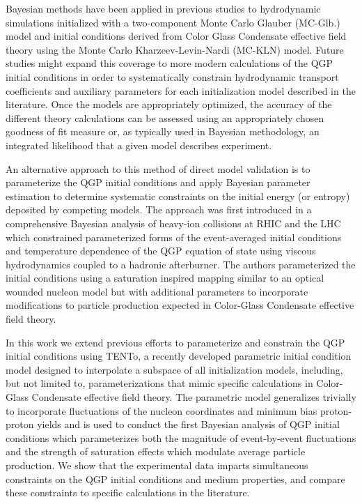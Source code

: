 \documentclass[aps,prc,reprint,amsmath,nofootinbib]{revtex4-1}
\newcommand{\trento}{T\raisebox{-0.5ex}{R}ENTo}
\begin{document}
Bayesian methods have been applied in previous studies to hydrodynamic simulations initialized with a two-component Monte Carlo Glauber (MC-Glb.) model and initial conditions derived from Color Glass Condensate effective field theory using the Monte Carlo Kharzeev-Levin-Nardi (MC-KLN) model.
Future studies might expand this coverage to more modern calculations of the QGP initial conditions in order to systematically constrain hydrodynamic transport coefficients and auxiliary parameters for each initialization model described in the literature.
Once the models are appropriately optimized, the accuracy of the different theory calculations can be assessed using an appropriately chosen goodness of fit measure or, as typically used in Bayesian methodology, an integrated likelihood that a given model describes experiment. 

An alternative approach to this method of direct model validation is to parameterize the QGP initial conditions and apply Bayesian parameter estimation to determine systematic constraints on the initial energy (or entropy) deposited by competing models.
The approach was first introduced in a comprehensive Bayesian analysis of heavy-ion collisions at RHIC and the LHC which constrained parameterized forms of the event-averaged initial conditions and temperature dependence of the QGP equation of state using viscous hydrodynamics coupled to a hadronic afterburner.
The authors parameterized the initial conditions using a saturation inspired mapping similar to an optical wounded nucleon model but with additional parameters to incorporate modifications to particle production expected in Color-Glass Condensate effective field theory.

In this work we extend previous efforts to parameterize and constrain the QGP initial conditions using \trento , a recently developed parametric initial condition model designed to interpolate a subspace of all initialization models, including, but not limited to, parameterizations that mimic specific calculations in Color-Glass Condensate effective field theory.
The parametric model generalizes trivially to incorporate fluctuations of the nucleon coordinates and minimum bias proton-proton yields and is used to conduct the first Bayesian analysis of QGP initial conditions which parameterizes both the magnitude of event-by-event fluctuations and the strength of saturation effects which modulate average particle production.
We show that the experimental data imparts simultaneous constraints on the QGP initial conditions and medium properties, and compare these constraints to specific calculations in the literature.  
\end{document}
